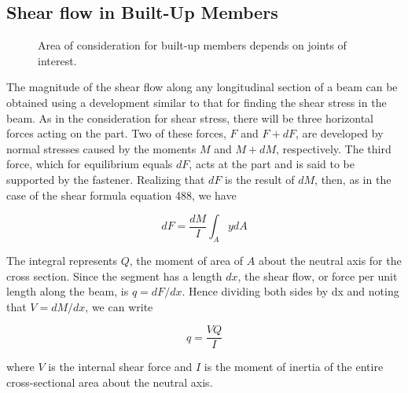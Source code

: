 \documentclass[
10pt,
a4paper,
openany,
svgnames,
]{kaobook} %
\begin{document}
\subsection{Shear flow in Built-Up Members}

\begin{figure}[h]
  \centering
  \caption{Area of consideration for built-up members depends on joints of interest.}
  \end{figure}

The magnitude of the shear flow along any longitudinal section of a beam can be obtained using a development similar to that for finding the shear stress in the beam. As in the consideration for shear stress, there will be three horizontal forces acting on the part. Two of these forces, $F$ and $F + dF$, are developed by normal stresses caused by the moments $M$ and $M + dM$, respectively. The third force, which for equilibrium equals $dF$, acts at the part and is said to be supported by the fastener.  Realizing that $dF$ is the result of $dM$, then, as in the case of the shear formula equation 488, we have

\begin{equation*}
  dF = \frac{dM}{I}\int_A ydA
\end{equation*}

The integral represents $Q$, the moment of area of $A$ about the neutral axis for the cross section. Since the segment has a length $dx$, the shear flow, or force per unit length along the beam, is $q = dF/dx$. Hence dividing both sides by dx and noting that $V = dM/dx$, we can write

\[q = \frac{VQ}{I}\]

where $V$ is the internal shear force and $I$ is the moment of inertia of the entire cross-sectional area about the neutral axis.
\end{document}
